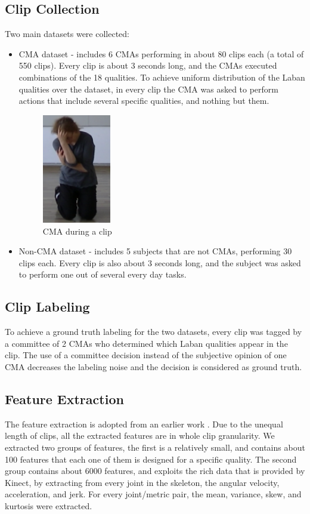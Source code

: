 \documentclass[11pt,twocolumn,varwidth=true,a4paper,fleqn]{sigchi}
\begin{document}
\subsection{Clip Collection}
Two main datasets were collected:
\begin{itemize}
  \item
  CMA dataset - includes 6 CMAs performing in about
  80 clips each (a total of 550 clips). Every clip is about 3 seconds long, 
  and the CMAs executed combinations of the 18 qualities.
  To achieve uniform distribution of the Laban qualities over the dataset, in every
  clip the CMA was asked to perform actions that include several specific qualities,
  and nothing but them.
  
  \begin{figure}[h]
\centering
\includegraphics[width=30mm]{Rachelle.png}
\caption{CMA during a clip}
\label{Rachelle}
\end{figure}

\item
Non-CMA dataset - includes 5 subjects that are not CMAs, performing 30 clips each. 
Every clip is also about 3 seconds long, and the subject was asked to perform one out 
of several every day tasks.
\end{itemize}
\subsection{Clip Labeling}
To achieve a ground truth labeling for the two datasets, every clip was tagged by
a committee of 2 CMAs who determined which Laban qualities appear in the
clip. The use of a committee decision instead of the subjective opinion of one
CMA decreases the labeling noise and the decision is considered as ground truth.
\subsection{Feature Extraction}
The feature extraction is adopted from an earlier work \cite{ran}.
Due to the unequal length of clips, all the extracted features are in whole clip 
granularity. We extracted two groups of features, the first is a relatively
small, and contains about 100 features that each one of them is designed for a
specific quality. The second group contains about 6000
features, and exploits the rich data that is provided by Kinect, by extracting from every joint in the skeleton, the
angular velocity, acceleration, and jerk. For every joint/metric pair, the mean,
variance, skew, and kurtosis were extracted. 
\end{document}
